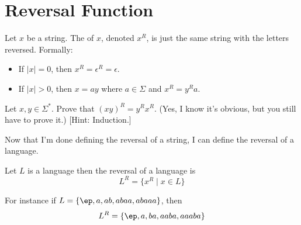 \section{Reversal Function}

\begin{defn}
Let $x$ be a string. The  of $x$, denoted $x^R$,
is just the same string with the letters reversed. Formally:
\begin{itemize}
 \item If $|x|=0$, then $x^R = \epsilon^R = \epsilon$.
 \item If $|x|>0$, then $x = ay$ where $a \in \Sigma$ and $x^R =
 y^Ra$.
\end{itemize}
\end{defn}


\newpage
\begin{ex}
Let $x,y \in \Sigma^*$. Prove that $(xy)^R = y^Rx^R$. (Yes, I know
it's obvious, but you still have to prove it.) [Hint: Induction.]
\end{ex}

\newpage
Now that I'm done defining the reversal of a string, I can
define the reversal of a language.

\begin{defn}
Let $L$ is a language then the reversal of a language is
\[
L^R = \{x^R \mid x \in L \}
\]
\end{defn}

For instance if $L = \{\ep, a, ab, abaa, abaaa\}$, then
\[
L^R = \{ \ep, a, ba, aaba, aaaba \}
\]
